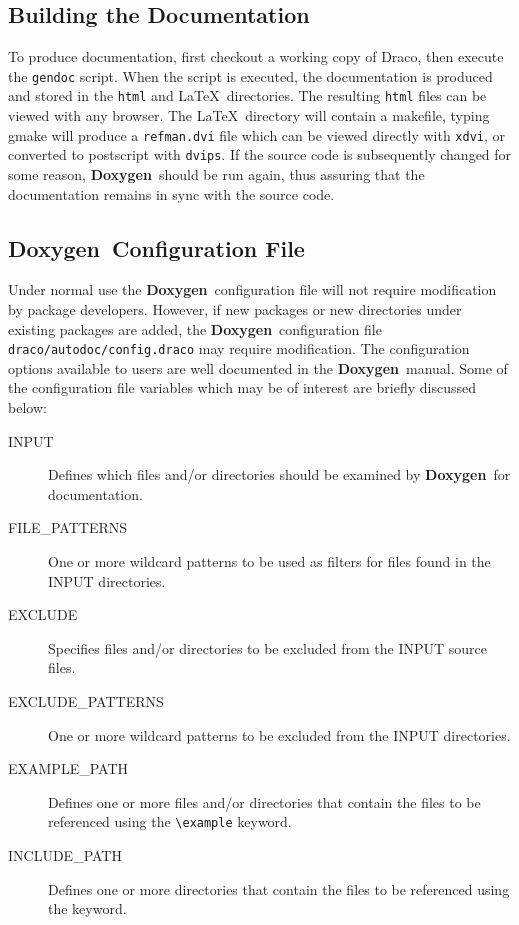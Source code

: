 \documentclass[11pt]{nmemo}
\newcommand{\draco}{{\normalfont\sffamily Draco}}
\newcommand{\doxy}{{\normalfont\bfseries Doxygen}}
\begin{document}
\subsection{Building the Documentation}

To produce documentation, first checkout a working copy of \draco, then
execute the \texttt{gendoc} script.
When the script is executed, 
the documentation is produced and stored in the
\texttt{html} and \LaTeX\ directories.
The resulting \texttt{html} files can be viewed with any browser. The \LaTeX\
directory will contain a makefile, typing gmake will produce 
a \texttt{refman.dvi} file which can be viewed directly with \texttt{xdvi},
or converted to postscript with \texttt{dvips}.
If the source code is subsequently changed for some reason,
\doxy\ should be run again, thus assuring that the documentation 
remains in sync with the source code.

\subsection{\doxy\ Configuration File}
\label{sec:config}

Under normal use the \doxy\ configuration file will not require
modification by package developers. However, if new packages or
new directories under existing packages are added,
the \doxy\ configuration file \texttt{draco/autodoc/config.draco}
may require modification.
The configuration options available to users are well
documented in the \doxy\ manual. Some of the configuration file 
variables which may be of interest are briefly discussed below:
\begin{description}
\item[\ttfamily INPUT] Defines which files and/or
  directories should be  examined by \doxy\ for documentation.  
\item [\ttfamily FILE\_PATTERNS] One or more wildcard patterns to be
  used as filters for files found in the INPUT directories. 
\item [\ttfamily EXCLUDE] Specifies files and/or directories to be
   excluded from the INPUT source files.
\item [\ttfamily EXCLUDE\_PATTERNS] One or more wildcard patterns to be
  excluded from the INPUT directories.
\item [\ttfamily EXAMPLE\_PATH] Defines one or more files and/or
  directories that contain the files to be referenced using
  the \verb+\example+ keyword.
\item [\ttfamily INCLUDE\_PATH] Defines one or more 
  directories that contain the files to be referenced using the
 \verb++ keyword.
\end{description}
\end{document}
